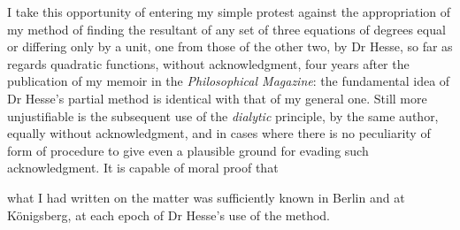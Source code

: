 \documentclass[11pt]{article}
\newcommand{\sourcepage}[1]{\marginpar{\scriptsize p.~#1}}
\begin{document}
{{I take this opportunity of entering my simple protest against the appropriation of my method of finding the resultant of any set of three equations of degrees equal or differing only by a unit, one from those of the other two, by Dr Hesse, so far as regards quadratic functions, without acknowledgment, four years after the publication of my memoir in the \emph{Philosophical Magazine}: the fundamental idea of Dr Hesse's partial method is identical with that of my general one. Still more unjustifiable is the subsequent use of the \emph{dialytic} principle, by the same author, equally without acknowledgment, and in cases where there is no peculiarity of form of procedure to give even a plausible ground for evading such acknowledgment. It is capable of moral proof that

\sourcepage{190}
what I had written on the matter was sufficiently known in Berlin and at K\"onigsberg, at each epoch of Dr Hesse's use of the method.

}}
\end{document}
